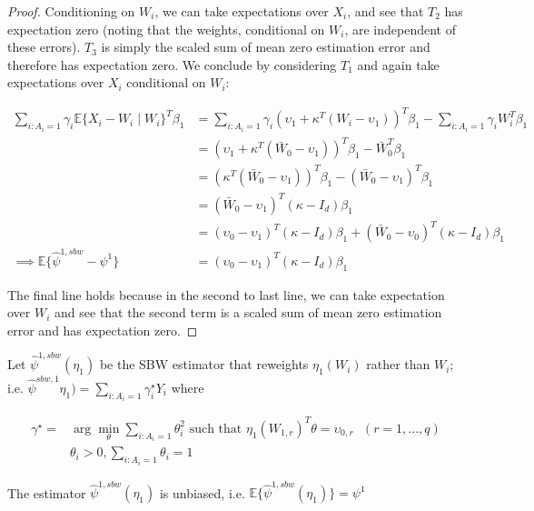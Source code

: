 \begin{proof}
Conditioning on $W_i$, we can take expectations over $X_i$, and see that $T_2$ has expectation zero (noting that the weights, conditional on $W_i$, are independent of these errors). $T_3$ is simply the scaled sum of mean zero estimation error and therefore has expectation zero. We conclude by considering $T_1$ and again take expectations over $X_i$ conditional on $W_i$: 

\begin{align*}
    \sum_{i: A_i = 1} \gamma_i\mathbb{E}\{X_i - W_i \mid W_i\}^T\beta_1 &= \sum_{i: A_i = 1} \gamma_i (\upsilon_1 + \kappa^T(W_i - \upsilon_1))^T\beta_1 - \sum_{i: A_i = 1}\gamma_i W_i^T\beta_1 \\
    &= (\upsilon_1 + \kappa^T(\bar{W}_0 - \upsilon_1))^T\beta_1 - \bar{W}_0^T\beta_1 \\
    &= (\kappa^T(\bar{W}_0 - \upsilon_1))^T\beta_1 - (\bar{W}_0 - \upsilon_1)^T\beta_1  \\
    &= (\bar{W}_0 - \upsilon_1)^T(\kappa - I_d)\beta_1 \\
    &= (\upsilon_0 - \upsilon_1)^T(\kappa - I_d)\beta_1 + (\bar{W}_0 - \upsilon_0)^T(\kappa - I_d)\beta_1 \\
    \implies \mathbb{E}\{\hat{\psi}^{1, sbw} - \psi^1\} &= (\upsilon_0 - \upsilon_1)^T(\kappa - I_d)\beta_1
\end{align*}

The final line holds because in the second to last line, we can take expectation over $W_i$ and see that the second term is a scaled sum of mean zero estimation error and has expectation zero. 
\end{proof}

Let $\hat{\psi}^{1, sbw}(\eta_1)$ be the SBW estimator that reweights $\eta_1(W_i)$ rather than $W_i$; i.e. $\hat{\psi}^{sbw, 1} \eta_1) = \sum_{i: A_i = 1}\gamma_i^\star Y_i$ where 

\begin{align*}
\gamma^\star = &\arg\min_{\theta} \sum_{i: A_i = 1}\theta_i^2 \text{ such that } \eta_1(W_{1, r})^T\theta = \upsilon_{0, r} \ \ \ (r = 1, ..., q) \\
&\theta_i > 0, \sum_{i: A_i = 1} \theta_i = 1
\end{align*}

\begin{proposition}
The estimator $\hat{\psi}^{1, sbw}(\eta_1)$ is unbiased, i.e.
$\mathbb{E}\{\hat{\psi}^{1, sbw}(\eta_1)\} = \psi^1$
\end{proposition}

